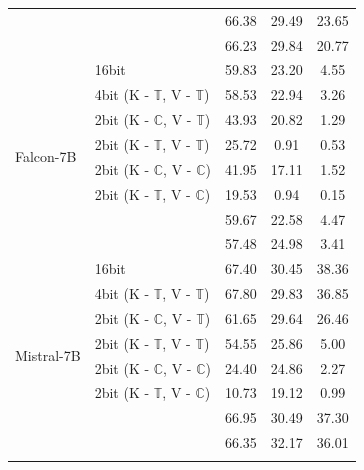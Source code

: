\begin{table}[h!]
{\begin{tabular}{llccc}
 & \kivifour{} & 66.38 & 29.49 & 23.65\\
 & \kivitwo{} & 66.23 & 29.84  & 20.77 \\
\midrule
\multirow{8}{*}{Falcon-7B}   & 16bit  &     59.83   &   23.20    &        4.55          \\
 & 4bit (K - $\mathbb{T}$, V - $\mathbb{T}$)  & 58.53 & 22.94 & 3.26\\
\cmidrule{2-5}
 & 2bit (K - $\mathbb{C}$, V - $\mathbb{T}$)   &  43.93 & 20.82 & 1.29 \\
 & 2bit (K - $\mathbb{T}$, V - $\mathbb{T}$)    & 25.72 & 0.91 & 0.53 \\
 & 2bit (K - $\mathbb{C}$, V - $\mathbb{C}$) & 41.95 & 17.11 & 1.52 \\
 & 2bit (K - $\mathbb{T}$, V - $\mathbb{C}$)   & 19.53 & 0.94 & 0.15 \\
 & \kivifour{} & 59.67 & 22.58 & 4.47 \\
 & \kivitwo{} & 57.48 & 24.98 & 3.41 \\
\midrule
\multirow{8}{*}{Mistral-7B}   & 16bit  &     67.40  &  30.45  &  38.36     \\
 & 4bit (K - $\mathbb{T}$, V - $\mathbb{T}$)  & 67.80 & 29.83 & 36.85 \\
\cmidrule{2-5}
 & 2bit (K - $\mathbb{C}$, V - $\mathbb{T}$)   & 61.65 & 29.64 & 26.46 \\
 & 2bit (K - $\mathbb{T}$, V - $\mathbb{T}$)     & 54.55 & 25.86 & 5.00 \\
 & 2bit (K - $\mathbb{C}$, V - $\mathbb{C}$) & 24.40 & 24.86 & 2.27  \\
 & 2bit (K - $\mathbb{T}$, V - $\mathbb{C}$)   & 10.73 & 19.12 & 0.99 \\
 & \kivifour{} & 66.95 & 30.49 & 37.30\\
 & \kivitwo{} & 66.35 & 32.17 & 36.01  \\
\bottomrule
\vspace{-1.5em}
\end{tabular}
}
\end{table}